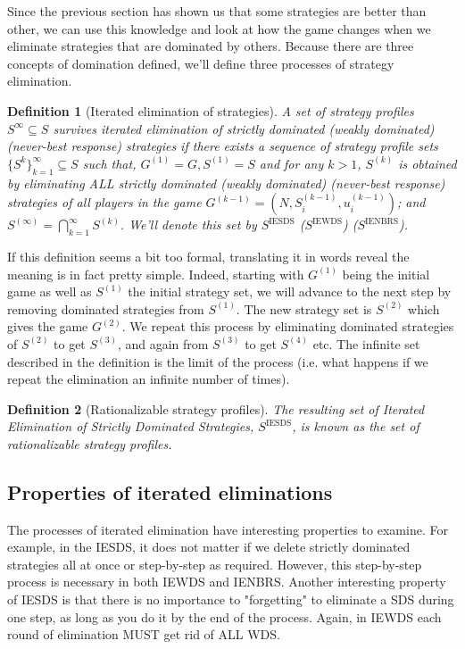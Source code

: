 \documentclass[12pt]{report}
\newtheorem{definition}{Definition}[chapter]
\begin{document}
Since the previous section has shown us that some strategies are better than other, we can use this knowledge and look at how the game changes when we eliminate strategies that are dominated by others. Because there are three concepts of domination defined, we'll define three processes of strategy elimination.

\begin{definition}[Iterated elimination of strategies]
A set of strategy profiles $S^\infty\subseteq S$ survives iterated elimination of strictly dominated (weakly dominated) (never-best response) strategies if there exists a sequence of strategy profile sets $\{S^k\}_{k=1}^{\infty}\subseteq S$ such that, $G^{(1)} = G, S^{(1)} = S$ and for any $k>1$, $S^{(k)}$ is obtained by eliminating ALL strictly dominated (weakly dominated) (never-best response) strategies of all players in the game $G^{(k-1)} = \left(N, S_i^{(k-1)}, u_i^{(k-1)}\right)$; and $S^{(\infty)} = \bigcap_{k=1}^{\infty} S^{(k)}$. We'll denote this set by $S^{\text{IESDS}}$ ($S^{\text{IEWDS}}$) ($S^{\text{IENBRS}}$).
\end{definition} If this definition seems a bit too formal, translating it in words reveal the meaning is in fact pretty simple. Indeed, starting with $G^{(1)}$ being the initial game as well as $S^{(1)}$ the initial strategy set, we will advance to the next step by removing dominated strategies from $S^{(1)}$. The new strategy set is $S^{(2)}$ which gives the game $G^{(2)}$. We repeat this process by eliminating dominated strategies of $S^{(2)}$ to get $S^{(3)}$, and again from $S^{(3)}$ to get $S^{(4)}$ etc. The infinite set described in the definition is the limit of the process (i.e. what happens if we repeat the elimination an infinite number of times). 

\begin{definition}[Rationalizable strategy profiles]
The resulting set of Iterated Elimination of Strictly Dominated Strategies, $S^{\text{IESDS}}$, is known as the set of rationalizable strategy profiles.
\end{definition}

\subsection{Properties of iterated eliminations}

The processes of iterated elimination have interesting properties to examine. For example, in the IESDS, it does not matter if we delete strictly dominated strategies all at once or step-by-step as required. However, this step-by-step process is necessary in both IEWDS and IENBRS. Another interesting property of IESDS is that there is no importance to "forgetting" to eliminate a SDS during one step, as long as you do it by the end of the process. Again, in IEWDS each round of elimination MUST get rid of ALL WDS. 
\end{document}
